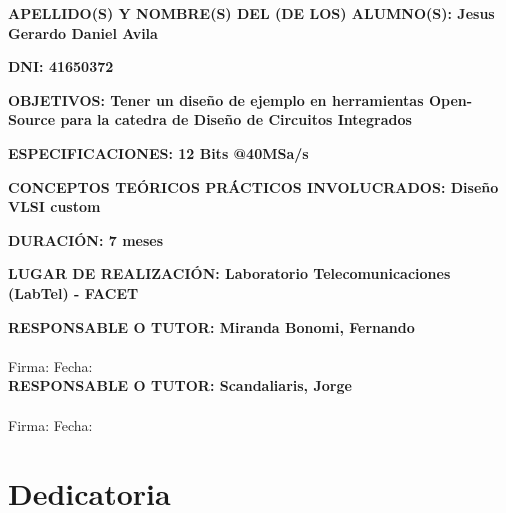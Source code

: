 \documentclass[12pt,a4paper]{report}
\begin{document}
\vspace{1.5cm}

\noindent
\textbf{APELLIDO(S) Y NOMBRE(S) DEL (DE LOS) ALUMNO(S): Jesus Gerardo Daniel Avila}

\vspace{1.5cm}

\noindent
\textbf{DNI: 41650372}

\vspace{1.5cm}

\noindent
\textbf{OBJETIVOS: Tener un diseño de ejemplo en herramientas Open-Source para la catedra de Diseño de Circuitos Integrados}

\vspace{2.5cm}

\noindent
\textbf{ESPECIFICACIONES: 12 Bits @40MSa/s}

\vspace{2.5cm}

\noindent
\textbf{CONCEPTOS TEÓRICOS PRÁCTICOS INVOLUCRADOS: Diseño VLSI custom}

\vspace{2.5cm}

\noindent
\textbf{DURACIÓN: 7 meses}

\vspace{1.5cm}

\noindent
\textbf{LUGAR DE REALIZACIÓN: Laboratorio Telecomunicaciones (LabTel) - FACET}

\vspace{2cm}

\noindent
\textbf{RESPONSABLE O TUTOR: Miranda Bonomi, Fernando} \hspace{3cm} \\ \\ Firma: \hspace{3cm} Fecha:
\vspace{1.5cm}
\noindent
\textbf{\\ RESPONSABLE O TUTOR: Scandaliaris, Jorge} \hspace{3cm} \\ \\ Firma: \hspace{3cm} Fecha:
\vspace{1.5cm}

\newpage
\chapter*{Dedicatoria}
\thispagestyle{empty}

\vspace*{5cm}
\end{document}
